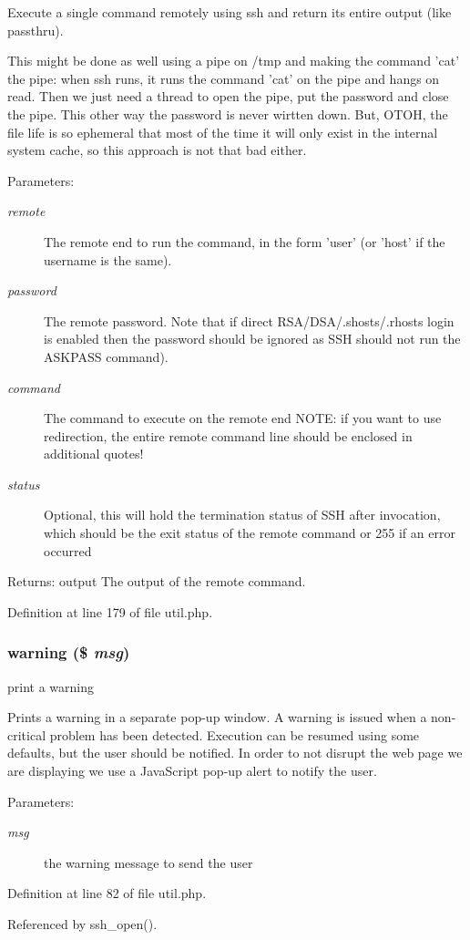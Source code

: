 Execute a single command remotely using ssh and return its entire output (like passthru). 

This might be done as well using a pipe on /tmp and making the command 'cat' the pipe: when ssh runs, it runs the command 'cat' on the pipe and hangs on read. Then we just need a thread to open the pipe, put the password and close the pipe. This other way the password is never wirtten down. But, OTOH, the file life is so ephemeral that most of the time it will only exist in the internal system cache, so this approach is not that bad either.

\begin{Desc}
\item[Parameters:]
\begin{description}
\item[{\em remote}]The remote end to run the command, in the form 'user' (or 'host' if the username is the same). \item[{\em password}]The remote password. Note that if direct RSA/DSA/.shosts/.rhosts login is enabled then the password should be ignored as SSH should not run the ASKPASS command). \item[{\em command}]The command to execute on the remote end NOTE: if you want to use redirection, the entire remote command line should be enclosed in additional quotes! \item[{\em status}]Optional, this will hold the termination status of SSH after invocation, which should be the exit status of the remote command or 255 if an error occurred \end{description}
\end{Desc}
\begin{Desc}
\item[Returns:]output The output of the remote command. \end{Desc}


Definition at line 179 of file util.php.
\subsubsection{\setlength{\rightskip}{0pt plus 5cm}warning (\$ {\em msg})}\label{util_8php_a2}


print a warning 

Prints a warning in a separate pop-up window. A warning is issued when a non-critical problem has been detected. Execution can be resumed using some defaults, but the user should be notified. In order to not disrupt the web page we are displaying we use a Java\-Script pop-up alert to notify the user.

\begin{Desc}
\item[Parameters:]
\begin{description}
\item[{\em msg}]the warning message to send the user \end{description}
\end{Desc}


Definition at line 82 of file util.php.

Referenced by ssh\_\-open().